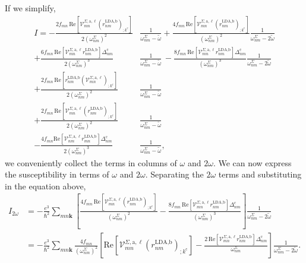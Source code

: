 If we simplify,
\begin{align}\label{simplified_i} 
I =
-   \frac{2f_{mn}\,\mathrm{Re}\left[\mathcal{V}^{\Sigma,\text{a},\ell}_{mn}
    \left(r^{\text{LDA,b}}_{nm}\right)_{;k^{\text{c}}}\right]}
    {2(\omega^{\Sigma}_{nm})^{2}}&\frac{1}{\omega^{\Sigma}_{nm}-\tilde\omega}
+   \frac{4f_{mn}\,\mathrm{Re}\left[\mathcal{V}^{\Sigma,\text{a},\ell}_{mn}
    \left(r^{\text{LDA,b}}_{nm}\right)_{;k^{\text{c}}}\right]}
    {(\omega^{\Sigma}_{nm})^{2}}\frac{1}{\omega^{\Sigma}_{nm}-2\tilde\omega}
    \nonumber\\
+   \frac{6f_{mn}\,\mathrm{Re}\left[\mathcal{V}^{\Sigma,\text{a},\ell}_{mn}
    r^{\text{LDA,b}}_{nm}\right]
    \Delta^{\text{c}}_{nm}}{2(\omega^{\Sigma}_{nm})^{3}}
    &\frac{1}{\omega^{\Sigma}_{nm}-\tilde\omega} 
\,- \frac{8f_{mn}\,\mathrm{Re}
    \left[
    \mathcal{V}^{\Sigma,\text{a},\ell}_{mn}
    r^{\text{LDA,b}}_{nm}
    \right]
    \Delta^{\text{c}}_{nm}}{(\omega^{\Sigma}_{nm})^{3}}
    \frac{1}{\omega^{\Sigma}_{nm}-2\tilde\omega}\nonumber\\
+   \frac{2f_{mn}\,\mathrm{Re}\left[r^{\text{LDA,b}}_{nm}
    \left(\mathcal{V}^{\Sigma,\text{a},\ell}_{mn}\right)
    _{;k^{\text{c}}}\right]}{2(\omega^{\Sigma}_{nm})^{2}}
    &\frac{1}{\omega^{\Sigma}_{nm}-\tilde\omega}\nonumber\\
+   \frac{2f_{mn}\,\mathrm{Re}\left[\mathcal{V}^{\Sigma,\text{a},\ell}_{mn}
    \left(r^{\text{LDA,b}}_{nm}\right)_{;k^{\text{c}}}\right]}
    {2(\omega^{\Sigma}_{nm})^{2}}&\frac{1}{\omega^{\Sigma}_{nm}-\tilde\omega}
    \nonumber\\
-   \frac{4f_{mn}\mathrm{Re}
    \left[
    \mathcal{V}^{\Sigma,\text{a},\ell}_{nm}
    r^{\text{LDA,b}}_{mn}
    \right]
    \Delta_{nm}^{\text{c}}}{2(\omega^{\Sigma}_{nm})^{3}}
    &\frac{1}{\omega^{\Sigma}_{nm}-\tilde\omega},
\end{align}
we conveniently collect the terms in columns of $\omega$ and $2\omega$. We can
now express the susceptibility in terms of $\omega$ and $2\omega$. Separating
the $2\omega$ terms and substituting in the equation above,
\begin{align}\label{2wchii}
I_{2\omega}
&=  -\frac{e^{3}}{\hbar^2}\sum_{mn\mathbf{k}}\left[\frac{4f_{mn}\,\mathrm{Re}
    \left[\mathcal{V}^{\Sigma,\text{a},\ell}_{mn}
    \left(r^{\text{LDA,b}}_{nm}\right)_{;k^{\text{c}}}\right]}
    {(\omega^{\Sigma}_{nm})^{2}} - \frac{8f_{mn}\,\mathrm{Re}
    \left[\mathcal{V}^{\Sigma,\text{a},\ell}_{mn}r^{\text{LDA,b}}_{nm}\right]
    \Delta^{\text{c}}_{nm}}{(\omega^{\Sigma}_{nm})^{3}}\right]
    \frac{1}{\omega^{\Sigma}_{nm}-2\tilde\omega}\nonumber\\
&=  -\frac{e^3}{\hbar^2}\sum_{mn\mathbf{k}}
    \frac{4f_{mn}}{(\omega^{\Sigma}_{nm})^{2}}
    \left[
    \mathrm{Re}\left[\mathcal{V}^{\Sigma,\text{a},\ell}_{mn}
    \left(r^{\text{LDA,b}}_{nm}\right)_{;k^{\text{c}}}\right] 
-   \frac{2\,\mathrm{Re}\left[\mathcal{V}^{\Sigma,\text{a},\ell}_{mn}
    r^{\text{LDA,b}}_{nm}\right]\Delta^{\text{c}}_{nm}}{\omega^{\Sigma}_{nm}}
    \right]
    \frac{1}{\omega^{\Sigma}_{nm}-2\tilde\omega}.
\end{align}

